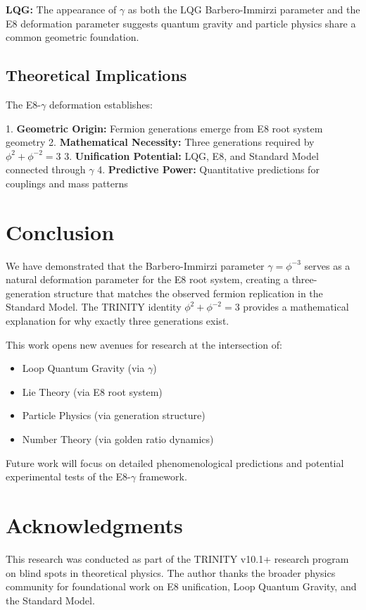 \documentclass[12pt,a4paper]{article}
\begin{document}
\textbf{LQG:} The appearance of $\gamma$ as both the LQG Barbero-Immirzi parameter and the E8 deformation parameter suggests quantum gravity and particle physics share a common geometric foundation.

\subsection{Theoretical Implications}

The E8-$\gamma$ deformation establishes:

1. \textbf{Geometric Origin:} Fermion generations emerge from E8 root system geometry
2. \textbf{Mathematical Necessity:} Three generations required by $\phi^2 + \phi^{-2} = 3$
3. \textbf{Unification Potential:} LQG, E8, and Standard Model connected through $\gamma$
4. \textbf{Predictive Power:} Quantitative predictions for couplings and mass patterns

\section{Conclusion}

We have demonstrated that the Barbero-Immirzi parameter $\gamma = \phi^{-3}$ serves as a natural deformation parameter for the E8 root system, creating a three-generation structure that matches the observed fermion replication in the Standard Model. The TRINITY identity $\phi^2 + \phi^{-2} = 3$ provides a mathematical explanation for why exactly three generations exist.

This work opens new avenues for research at the intersection of:
\begin{itemize}
\item Loop Quantum Gravity (via $\gamma$)
\item Lie Theory (via E8 root system)
\item Particle Physics (via generation structure)
\item Number Theory (via golden ratio dynamics)
\end{itemize}

Future work will focus on detailed phenomenological predictions and potential experimental tests of the E8-$\gamma$ framework.

\section*{Acknowledgments}

This research was conducted as part of the TRINITY v10.1+ research program on blind spots in theoretical physics. The author thanks the broader physics community for foundational work on E8 unification, Loop Quantum Gravity, and the Standard Model.
\end{document}
